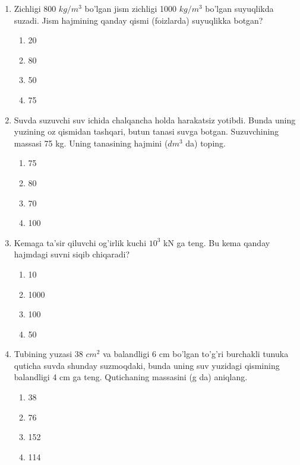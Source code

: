 \begin{enumerate}
\item Zichligi 800 $kg/m^3$ bo'lgan jism zichligi 1000 $kg/m^3$ bo'lgan suyuqlikda suzadi. Jism hajmining qanday qismi (foizlarda) suyuqlikka botgan?
\begin{enumerate}[label=\Alph*)]
\item 20
\item 80
\item 50
\item 75
\end{enumerate}

\item Suvda suzuvchi suv ichida chalqancha holda harakatsiz yotibdi. Bunda uning yuzining oz qismidan tashqari, butun tanasi suvga botgan. Suzuvchining massasi 75 kg. Uning tanasining hajmini ($dm^3$ da) toping.
\begin{enumerate}[label=\Alph*)]
\item 75
\item 80
\item 70
\item 100
\end{enumerate}

\item Kemaga ta'sir qiluvchi og'irlik kuchi $10^3$ kN ga teng. Bu kema qanday hajmdagi suvni siqib chiqaradi?
\begin{enumerate}[label=\Alph*)]
\item 10
\item 1000
\item 100
\item 50
\end{enumerate}

\item Tubining yuzasi 38 $cm^2$ va balandligi 6 cm bo'lgan to'g'ri burchakli tunuka quticha suvda shunday suzmoqdaki, bunda uning suv yuzidagi qismining balandligi 4 cm ga teng. Qutichaning massasini (g da) aniqlang.
\begin{enumerate}[label=\Alph*)]
\item 38
\item 76
\item 152
\item 114
\end{enumerate}

\end{enumerate}

